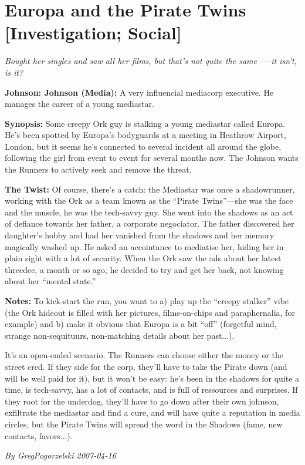 \documentclass[letterpaper,twocolumn,10.5pt]{article}
\newenvironment{scenario}[6]
	{
		\section{#1 {\small[#2]}}
		\textit{#3}
		\def\TMPSCENARIO{#4 #5}
	}
	{\small\textit{By \TMPSCENARIO}}
\newcommand{\johnson}[2]{\textbf{Johnson: #1 (#2):}}
\newcommand{\synopsis}{\textbf{Synopsis: }}
\newcommand{\notes}{\textbf{Notes: }}
\newcommand{\twist}{\textbf{The Twist: }}
\begin{document}
\begin{scenario}{Europa and the Pirate Twins}
	{Investigation; Social}
	{ Bought her singles and saw all her films, but that's not quite the same --- it isn't, is it?}
	{GregPogorzelski}
	{2007-04-16}
	{https://forum.rpg.net/showthread.php?321504-Shadowrun-4th-101-Instant-Scenarios\&p=7177053#post7177053}

\johnson{Johnson}{Media}  
A very influencial mediacorp executive. He manages the career of a young mediastar.

\synopsis Some creepy Ork guy is stalking a young mediastar called Europa. He's been spotted by Europa's bodyguards at a meeting in Heathrow Airport, London, but it seems he's connected to several incident all around the globe, following the girl from event to event for several months now. The Johnson wants the Runners to actively seek and remove the threat.

\twist Of course, there's a catch: the Mediastar was once a shadowrunner, working with the Ork as a team known as the ``Pirate Twins''---she was the face and the muscle, he was the tech-savvy guy. She went into the shadows as an act of defiance towards her father, a corporate negociator. The father discovered her daughter's hobby and had her vanished from the shadows and her memory magically washed up. He asked an accointance to mediatise her, hiding her in plain sight with a lot of security. When the Ork saw the ads about her latest threedee, a month or so ago, he decided to try and get her back, not knowing about her ``mental state.''

\notes To kick-start the run, you want to a) play up the ``creepy stalker'' vibe (the Ork hideout is filled with her pictures, films-on-chips and paraphernalia, for example) and b) make it obvious that Europa is a bit ``off'' (forgetful mind, strange non-sequituurs, non-matching details about her past...).

It's an open-ended scenario. The Runners can choose either the money or the street cred. If they side for the corp, they'll have to take the Pirate down (and will be well paid for it), but it won't be easy: he's been in the shadows for quite a time, is tech-savvy, has a lot of contacts, and is full of ressources and surprises. If they root for the underdog, they'll have to go down after their own johnson, exfiltrate the mediastar and find a cure, and will have quite a reputation in media circles, but the Pirate Twins will spread the word in the Shadows (fame, new contacts, favors...). 

\end{scenario}
\end{document}
